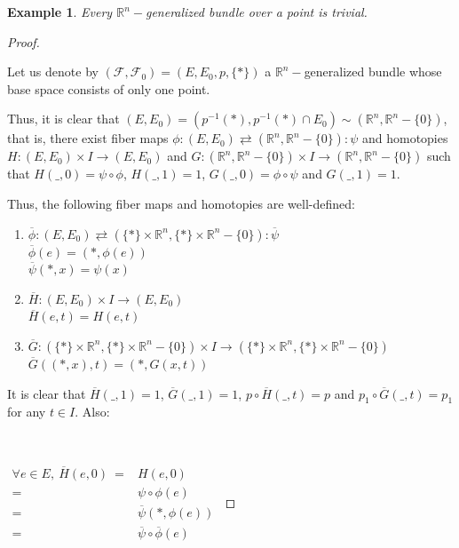 \documentclass[12pt,oneside]{book}
\newtheorem{ex}     {Example}[chapter]
\newcommand{\R}{\mathbb{R}}
\begin{document}
    \begin{ex}\label{fht_sobre_ponto}
        Every $\R^{n}-$generalized bundle over a point is trivial.
    \end{ex}
    \begin{proof}
    
        \
    
        Let us denote by $(\mathcal{F},\mathcal{F}_{0})=(E,E_{0},p,\{ * \})$ a $\R^{n}-$generalized bundle whose base space consists of only 
        one point.
    
        Thus, it is clear that $(E,E_{0})=(p^{-1}(*),p^{-1}(*)\cap E_{0})\sim (\R^{n},\R^{n}-\{0 \})$, that is, there exist fiber maps 
        $\phi:(E,E_{0})\rightleftarrows (\R^{n},\R^{n}-\{ 0 \}):\psi$ and homotopies $H:(E,E_{0})\times I\to (E,E_{0})$ and 
        $G:(\R^{n},\R^{n}-\{0 \})\times I\to (\R^{n},\R^{n}-\{0 \})$ such that $H(\_,0)=\psi\circ\phi$, $H(\_,1)=1$, $G(\_,0)=\phi\circ\psi$ 
        and $G(\_,1)=1$.
    
        Thus, the following fiber maps and homotopies are well-defined:
    
        \begin{enumerate}
            \item $\overline{\phi}:(E,E_{0})\rightleftarrows (\{ * \}\times\R^{n},\{ * \}\times\R^{n}-\{0 \}):\overline{\psi}$ \\
            $ \overline{\phi}(e)=(*,\phi(e)) $ \\
            $ \overline{\psi}(*,x)=\psi(x) $
            \item $\overline{H}:(E,E_{0})\times I\to (E,E_{0})$ \\
            $ \overline{H}(e,t)=H(e,t) $
            \item $\overline{G}:(\{ * \}\times\R^{n},\{ * \}\times\R^{n}-\{0 \})\times I \to (\{ * \}\times\R^{n},\{ * \}\times\R^{n}-\{0 \})$ \\
            $ \overline{G}((*,x),t)=(*,G(x,t)) $
        \end{enumerate}
    
        It is clear that $\overline{H}(\_,1)=1$, $\overline{G}(\_,1)=1$, $p\circ\overline{H}(\_,t)=p$ and $p_{1}\circ\overline{G}(\_,t)=p_{1}$ 
        for any $t\in I$. Also:

        \
    
        $\begin{array}{rl}
            \forall e\in E, \ \overline{H}(e,0) \ = & H(e,0) \\
            = & \psi\circ\phi(e) \\
            = & \overline{\psi}(*,\phi(e)) \\
            = & \overline{\psi}\circ\overline{\phi}(e)
        \end{array}$


\end{proof}
\end{document}
